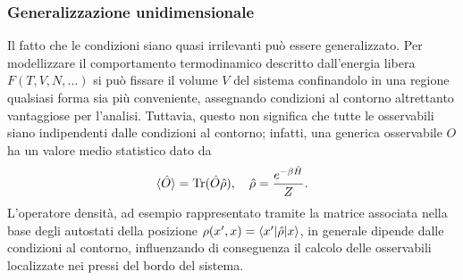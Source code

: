 \subsubsection{Generalizzazione unidimensionale}
Il fatto che le condizioni siano quasi irrilevanti può essere generalizzato. Per modellizzare il comportamento termodinamico descritto dall'energia libera $F(T,V,N,\dots)$ si può fissare il volume $V$ del sistema confinandolo in una regione qualsiasi forma sia più conveniente, assegnando condizioni al contorno altrettanto vantaggiose per l'analisi. Tuttavia, questo non significa che tutte le osservabili siano indipendenti dalle condizioni al contorno; infatti, una generica osservabile $O$ ha un valore medio statistico dato da
\begin{equation}
    \langle \hat{O} \rangle = \mathrm{Tr}(\hat{O}\hat{\rho}),\quad\hat{\rho} = \frac{e^{-\beta\hat{H}}}{Z}.
\end{equation}
L'operatore densità, ad esempio rappresentato tramite la matrice associata nella base degli autostati della posizione $\rho(x',x) = \langle x' | \hat{\rho} | x \rangle$, in generale dipende dalle condizioni al contorno, influenzando di conseguenza il calcolo delle osservabili localizzate nei pressi del bordo del sistema. 

